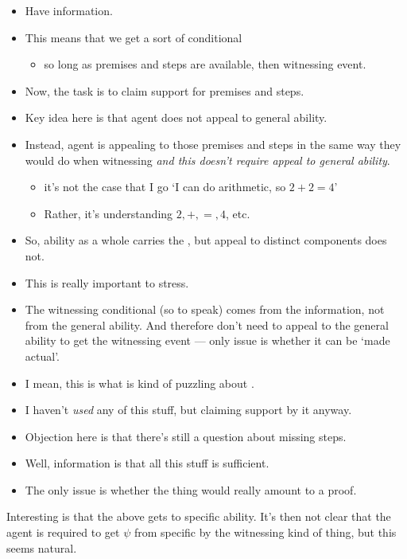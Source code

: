 \begin{note}
  \large
  \begin{itemize}
  \item Have \gsi{} information.
  \item This means that we get a sort of conditional
    \begin{itemize}
    \item so long as premises and steps are available, then witnessing event.
    \end{itemize}
  \item Now, the task is to claim support for premises and steps.
  \item Key idea here is that agent does not appeal to general ability.
  \item Instead, agent is appealing to those premises and steps in the same way they would do when witnessing \emph{and this doesn't require appeal to general ability}.
    \begin{itemize}
    \item it's not the case that I go `I can do arithmetic, so \(2 + 2 = 4\)'
    \item Rather, it's understanding \(2,+,=,4\), etc.
    \end{itemize}
  \item So, ability as a whole carries the \requ{}, but appeal to distinct components does not.
  \item This is really important to stress.
  \item The witnessing conditional (so to speak) comes from the information, not from the general ability.
    And therefore don't need to appeal to the general ability to get the witnessing event --- only issue is whether it can be `made actual'.
  \item I mean, this is what is kind of puzzling about \EAS{}.
  \item I haven't \emph{used} any of this stuff, but claiming support by it anyway.
  \end{itemize}

  \begin{itemize}
  \item Objection here is that there's still a question about missing steps.
  \item Well, information is that all this stuff is sufficient.
  \item The only issue is whether the thing would really amount to a proof.
  \end{itemize}

  \begin{note}
    Interesting is that the above gets to specific ability.
    It's then not clear that the agent is required to get \(\psi\) from specific by the witnessing kind of thing, but this seems natural.
  \end{note}
\end{note}

